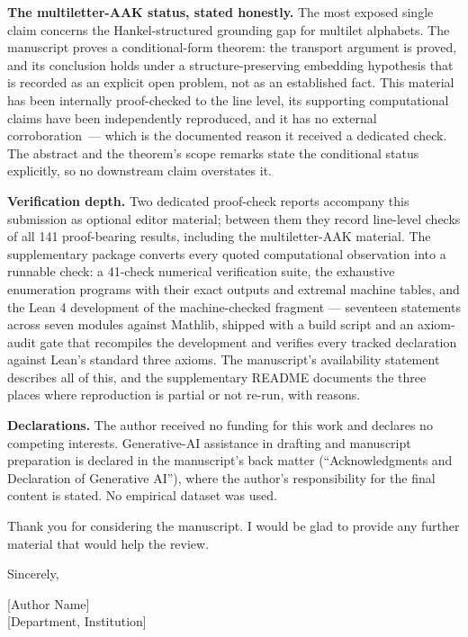 \documentclass[11pt,a4paper]{article}
\begin{document}
\textbf{The multiletter-AAK status, stated honestly.} The most exposed
single claim concerns the Hankel-structured grounding gap for multilet
alphabets. The manuscript proves a conditional-form theorem: the transport
argument is proved, and its conclusion holds under a structure-preserving
embedding hypothesis that is recorded as an explicit open problem, not as an
established fact. This material has been internally proof-checked to the
line level, its supporting computational claims have been independently
reproduced, and it has no external corroboration~--- which is the documented
reason it received a dedicated check. The abstract and the theorem's
scope remarks state the conditional status explicitly, so no downstream
claim overstates it.

\textbf{Verification depth.} Two dedicated proof-check reports accompany
this submission as optional editor material; between them they record
line-level checks of all 141 proof-bearing results, including the
multiletter-AAK material. The supplementary package converts every quoted
computational observation into a runnable check: a 41-check numerical
verification suite, the exhaustive enumeration programs with their exact
outputs and extremal machine tables, and the Lean 4 development of the
machine-checked fragment --- seventeen statements across seven modules
against Mathlib, shipped with a build script and an axiom-audit gate that
recompiles the development and verifies every tracked declaration against
Lean's standard three axioms. The manuscript's availability statement
describes all of this, and the supplementary README documents the three
places where reproduction is partial or not re-run, with reasons.

\textbf{Declarations.} The author received no funding for this work and
declares no competing interests. Generative-AI assistance in drafting and
manuscript preparation is declared in the manuscript's back matter
(``Acknowledgments and Declaration of Generative AI''), where the author's
responsibility for the final content is stated. No empirical dataset was
used.

Thank you for considering the manuscript. I would be glad to provide any
further material that would help the review.

\bigskip

Sincerely,

\medskip

[Author Name]\\
{}[Department, Institution]
\end{document}

